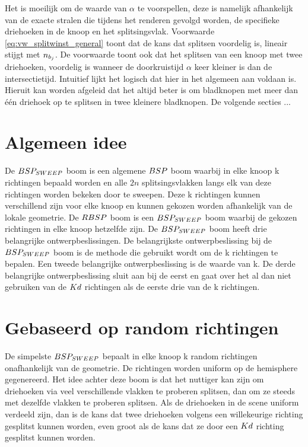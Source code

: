 Het is moeilijk om de waarde van $\alpha$ te voorspellen, deze is namelijk afhankelijk van de exacte stralen die tijdens het renderen gevolgd worden, de specifieke driehoeken in de knoop en het splitsingsvlak. Voorwaarde \ref{eq:vw_splitwinst_general} toont dat de kans dat splitsen voordelig is, lineair stijgt met $n_{b_j}$. De voorwaarde toont ook dat het splitsen van een knoop met twee driehoeken, voordelig is wanneer de doorkruistijd $\alpha$ keer kleiner is dan de intersectietijd. Intuitief lijkt het logisch dat hier in het algemeen aan voldaan is. Hieruit kan worden afgeleid dat het altijd beter is om bladknopen met meer dan één driehoek op te splitsen in twee kleinere bladknopen. De volgende secties ... \\



\section{Algemeen idee}
    De $BSP_{SWEEP}$ boom is een algemene $BSP$ boom waarbij in elke knoop k richtingen bepaald worden en alle $2n$ splitsingsvlakken langs elk van deze richtingen worden bekeken door te sweepen.
    Deze k richtingen kunnen verschillend zijn voor elke knoop en kunnen gekozen worden afhankelijk van de lokale geometrie.
    De $RBSP$ boom is een $BSP_{SWEEP}$ boom waarbij de gekozen richtingen in elke knoop hetzelfde zijn.
    De $BSP_{SWEEP}$ boom heeft drie belangrijke ontwerpbeslissingen.
    De belangrijkste ontwerpbeslissing bij de $BSP_{SWEEP}$ boom is de methode die gebruikt wordt om de k richtingen te bepalen.
    Een tweede belangrijke ontwerpbeslissing is de waarde van k.
    De derde belangrijke ontwerpbeslissing sluit aan bij de eerst en gaat over het al dan niet gebruiken van de $Kd$ richtingen als de eerste drie van de k richtingen.
    \\


\section{Gebaseerd op random richtingen}
De simpelste $BSP_{SWEEP}$ bepaalt in elke knoop k random richtingen onafhankelijk van de geometrie.
De richtingen worden uniform op de hemisphere gegenereerd.
Het idee achter deze boom is dat het nuttiger kan zijn om driehoeken via veel verschillende vlakken te proberen splitsen, dan om ze steeds met dezelfde vlakken te proberen splitsen.
Als de driehoeken in de scene uniform verdeeld zijn, dan is de kans dat twee driehoeken volgens een willekeurige richting gesplitst kunnen worden, even groot als de kans dat ze door een $Kd$ richting gesplitst kunnen worden.\\

